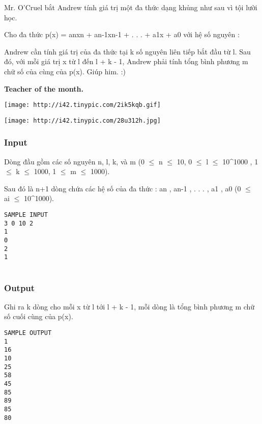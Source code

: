 

Mr. O'Cruel bắt Andrew tính giá trị một đa thức dạng khủng như sau vì tội lười học.

Cho đa thức p(x) = anxn + an-1xn-1 + . . . + a1x + a0 với hệ số nguyên :

Andrew cần tính giá trị của đa thức tại k số nguyên liên tiếp bắt đầu từ l. Sau đó, với mỗi giá trị x từ l đến l + k - 1, Andrew phải tính tổng bình phương m chữ số của cùng của p(x). Giúp him. :)




\textbf{Teacher of the month. }


\texttt{[image: http://i42.tinypic.com/2ik5kqb.gif]}


\texttt{[image: http://i42.tinypic.com/28u312h.jpg]}

\subsubsection{Input}

Dòng đầu gồm các số nguyên n, l, k, và m (0  $\le$  n  $\le$  10, 0  $\le$  l  $\le$  10^1000 , 1  $\le$  k  $\le$  1000, 1  $\le$  m  $\le$  1000).

Sau đó là n+1 dòng chứa các hệ số của đa thức : an , an-1 , . . . , a1 , a0 (0  $\le$  ai  $\le$  10^1000).
\begin{verbatim}
SAMPLE INPUT
3 0 10 2
1
0
2
1


\end{verbatim}

\subsubsection{Output}

Ghi ra k dòng cho mỗi x từ l tới l + k - 1, mỗi dòng là tổng bình phương m chữ số cuối cùng của p(x).
\begin{verbatim}
SAMPLE OUTPUT
1
16
10
25
58
45
85
89
85
80
\end{verbatim}

 
